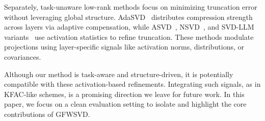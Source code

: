 \documentclass{article}
\begin{document}
Separately, task-unaware low-rank methods focus on minimizing truncation error without leveraging global structure. AdaSVD~\cite{li2025adasvd} distributes compression strength across layers via adaptive compensation, while ASVD~\cite{asvd}, NSVD~\cite{lu2025large}, and SVD-LLM variants~\cite{svdllm, wang2025svd} use activation statistics to refine truncation. These methods modulate projections using layer-specific signals like activation norms, distributions, or covariances.

Although our method is task-aware and structure-driven, it is potentially compatible with these activation-based refinements. Integrating such signals, as in KFAC-like schemes, is a promising direction we leave for future work. In this paper, we focus on a clean evaluation setting to isolate and highlight the core contributions of GFWSVD.






\end{document}
